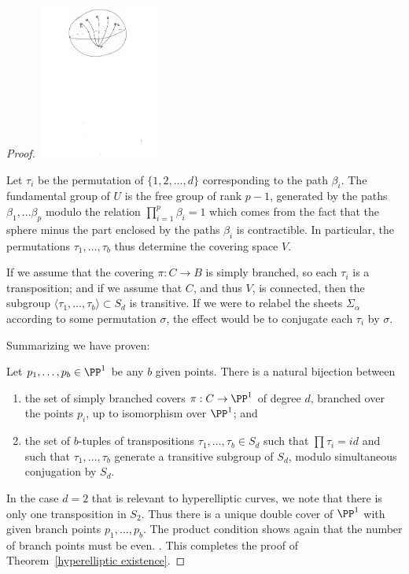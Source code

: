 \begin{proof}
\centerline{ \includegraphics[height=2in]{"pic42"}}

Let $\tau_i$ be the permutation of $\{1,2,\dots,d\}$ corresponding to the path $\beta_i$. The fundamental group of $U$ is the free group of rank $p-1$, generated by the paths $\beta_1,\dots \beta_p$ modulo the relation $\prod_{i=1}^p \beta_i = 1$
which comes from the fact that the sphere minus the part enclosed by the paths $\beta_i$ is 
contractible. In particular, the permutations $\tau_1,\dots,\tau_b$ thus determine the covering space $V$.
 
If we assume that the covering
$\pi : C \to B$ is simply branched, so each $\tau_i$ is a transposition; and if we assume that
$C$, and thus $V$, is connected, then the subgroup $\langle \tau_1, \dots, \tau_b \rangle \subset S_d$ is transitive. If we were to relabel the sheets $\Sigma_\alpha$ according to some permutation $\sigma$, the effect would be to conjugate each $\tau_i$ by $\sigma$. 

Summarizing we have proven:   
   \begin{lemma}\label{branched cover classification}
   Let $p_1,\dots, p_b \in \PP^1$ be any $b$ given points. There is a natural bijection between 
   \begin{enumerate}
   \item the set of  simply branched covers $\pi : C \to \PP^1$ of degree $d$, branched over the points $p_i$, up to isomorphism over $\PP^1$; and
   \item the set of $b$-tuples of transpositions $\tau_1, \dots, \tau_b \in S_d$ such that $\prod \tau_i = id$ and such that $\tau_1, \dots, \tau_b$ generate a transitive subgroup of $S_d$, modulo simultaneous conjugation by $S_d$.
   \end{enumerate}
   \end{lemma}
In the case $d=2$ that is relevant to hyperelliptic curves, we note that there is only one transposition in $S_2$. Thus there is a unique double cover of $\PP^1$ with given branch points $p_1,\dots,p_b$. The product
condition shows again that the number of branch points must be even. . This completes the proof of Theorem~\ref{hyperelliptic existence}.
\end{proof}

